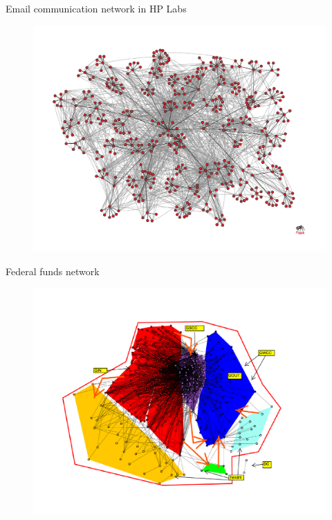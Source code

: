 \documentclass[10pt]{beamer}
\begin{document}
\begin{frame}{Email communication network in HP Labs}
	\begin{figure}
	\centering
	\includegraphics[scale=0.37]{Figs/email}
	\end{figure}
\end{frame}

\begin{frame}{Federal funds network}
	\begin{figure}
	\centering
	\includegraphics[scale=0.37]{Figs/fed}
	\end{figure}
\end{frame}
\end{document}
